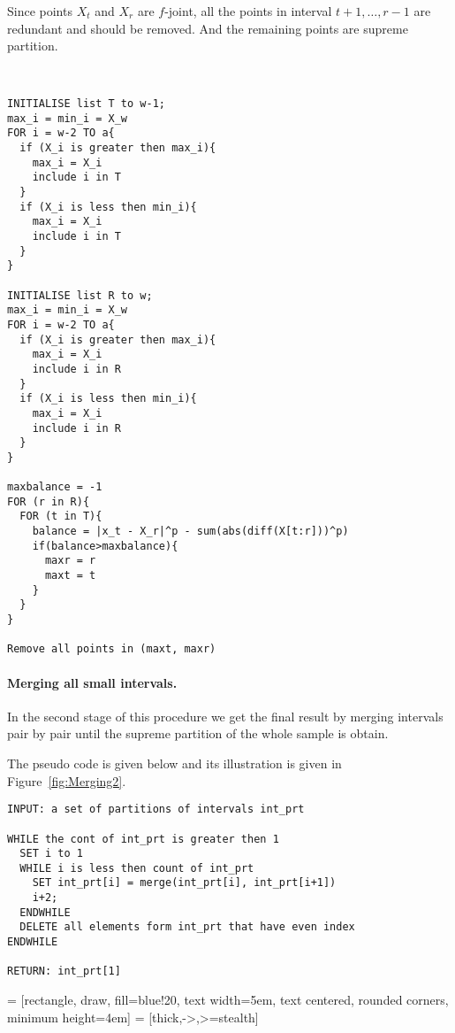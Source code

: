 \documentclass[12pt, a4paper]{article}
\numberwithin{equation}{section}
\begin{document}
Since points $X_t$ and $X_r$ are $f$-joint, all the 
points in interval $t+1,\dots, r-1$ are redundant
and should be removed. And the remaining points are supreme partition.

\begin{lstlisting}


INITIALISE list T to w-1;
max_i = min_i = X_w
FOR i = w-2 TO a{
  if (X_i is greater then max_i){
    max_i = X_i
    include i in T  
  }
  if (X_i is less then min_i){
    max_i = X_i
    include i in T  
  }
}

INITIALISE list R to w;
max_i = min_i = X_w
FOR i = w-2 TO a{
  if (X_i is greater then max_i){
    max_i = X_i
    include i in R  
  }
  if (X_i is less then min_i){
    max_i = X_i
    include i in R  
  }
}

maxbalance = -1
FOR (r in R){
  FOR (t in T){
    balance = |x_t - X_r|^p - sum(abs(diff(X[t:r]))^p)
    if(balance>maxbalance){
      maxr = r
      maxt = t
    }
  }
}

Remove all points in (maxt, maxr)

\end{lstlisting}


\paragraph{Merging all small intervals.}
In the second stage of this procedure we get the final result by
merging intervals pair by pair until the supreme partition of the whole sample is obtain.

The pseudo code is given below and its illustration is given in Figure~\ref{fig:Merging2}.



\begin{lstlisting}
INPUT: a set of partitions of intervals int_prt

WHILE the cont of int_prt is greater then 1
  SET i to 1  
  WHILE i is less then count of int_prt
    SET int_prt[i] = merge(int_prt[i], int_prt[i+1])
    i+2;
  ENDWHILE
  DELETE all elements form int_prt that have even index
ENDWHILE

RETURN: int_prt[1]
\end{lstlisting}


  
  
 = [rectangle, draw, fill=blue!20, 
    text width=5em, text centered, rounded corners, minimum height=4em]
 = [thick,->,>=stealth] %
  
\end{document}
